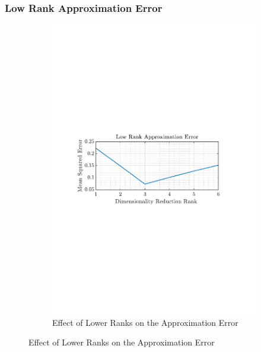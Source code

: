 \documentclass[12pt]{article}
\begin{document}
 	\subsubsection{Low Rank Approximation Error}
 	 \begin{figure}[H]
 		\centering
 		\begin{subfigure}{0.49\textwidth}
 			\centering
 			\includegraphics[trim={2.2cm 11.2cm 3.15cm  11.2cm}, clip, width=\textwidth]{../MATLAB/figures/q1_6b_fig01.pdf} 
 			\captionsetup{justification=centering}
 			\caption{Effect of Lower Ranks on the Approximation Error}
 		\end{subfigure}
 		\label{fig: 1-6b}
 	\end{figure}

 	
\end{document}
